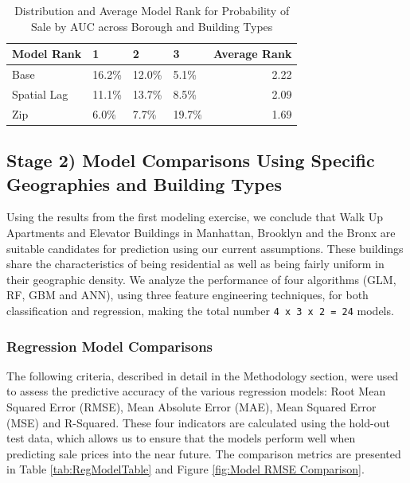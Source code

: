 \documentclass[12pt,]{article}
\begin{document}
\begin{table}

\caption{\label{tab:Prob Model AUC Average Rank}\label{tab:ProbModelAUCRank} Distribution and Average Model Rank for Probability of Sale by AUC across Borough and Building Types}
\centering
\begin{tabular}[t]{llllr}
\toprule
Model Rank & 1 & 2 & 3 & Average Rank\\
\midrule
Base & 16.2\% & 12.0\% & 5.1\% & 2.22\\
Spatial Lag & 11.1\% & 13.7\% & 8.5\% & 2.09\\
Zip & 6.0\% & 7.7\% & 19.7\% & 1.69\\
\bottomrule
\end{tabular}
\end{table}

\hypertarget{stage-2-model-comparisons-using-specific-geographies-and-building-types}{%
\subsection{Stage 2) Model Comparisons Using Specific Geographies and
Building
Types}\label{stage-2-model-comparisons-using-specific-geographies-and-building-types}}

Using the results from the first modeling exercise, we conclude that
Walk Up Apartments and Elevator Buildings in Manhattan, Brooklyn and the
Bronx are suitable candidates for prediction using our current
assumptions. These buildings share the characteristics of being
residential as well as being fairly uniform in their geographic density.
We analyze the performance of four algorithms (GLM, RF, GBM and ANN),
using three feature engineering techniques, for both classification and
regression, making the total number \texttt{4\ x\ 3\ x\ 2\ =\ 24}
models.

\hypertarget{regression-model-comparisons}{%
\subsubsection{Regression Model
Comparisons}\label{regression-model-comparisons}}

The following criteria, described in detail in the Methodology section,
were used to assess the predictive accuracy of the various regression
models: Root Mean Squared Error (RMSE), Mean Absolute Error (MAE), Mean
Squared Error (MSE) and R-Squared. These four indicators are calculated
using the hold-out test data, which allows us to ensure that the models
perform well when predicting sale prices into the near future. The
comparison metrics are presented in Table \ref{tab:RegModelTable} and
Figure \ref{fig:Model RMSE Comparison}.
\end{document}
